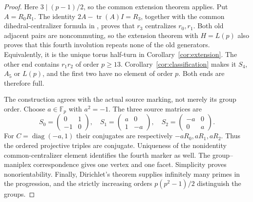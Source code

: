 \documentclass[11pt]{article}
\newcommand{\tr}{\operatorname{tr}}
\begin{document}
\begin{proof}
Here $3\mid(p-1)/2$, so the common extension theorem applies.
Put $A=R_0R_1$. The identity $2A-\tr(A)I=R_3$, together with the
common dihedral-centralizer formula in \cite[Lemma~1]{U}, proves that $r_3$
centralizes $r_0,r_1$. Both old adjacent pairs are noncommuting, so the
extension theorem with $H=L(p)$ also proves that this fourth involution
repeats none of the old generators. Equivalently, it is the unique
torus half-turn in Corollary~\ref{cor:extension}. The other end contains
$r_1r_2$ of order $p\ge13$. Corollary~\ref{cor:classification} makes it
$S_4$, $A_5$ or $L(p)$, and the first two have no element of order $p$.
Both ends are therefore full.

The construction agrees with the actual source marking, not merely its
group order. Choose $a\in\mathbb F_p$ with $a^2=-1$. The three source
matrices are
\[
 S_0=\begin{pmatrix}0&1\\-1&0\end{pmatrix},\quad
 S_1=\begin{pmatrix}a&0\\1&-a\end{pmatrix},\quad
 S_2=\begin{pmatrix}-a&0\\0&a\end{pmatrix}.
\]
For $C=\operatorname{diag}(-a,1)$ their conjugates are respectively
$-aR_0,aR_1,aR_2$. Thus the ordered projective triples are conjugate.
Uniqueness of the nonidentity common-centralizer element identifies the
fourth marker as well. The group--maniplex correspondence gives one
vertex and one facet. Simplicity proves nonorientability. Finally,
Dirichlet's theorem supplies infinitely many primes in the progression,
and the strictly increasing orders $p(p^2-1)/2$ distinguish the groups.
\end{proof}
\end{document}

